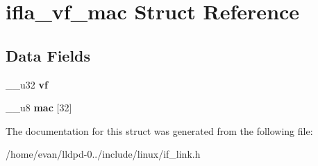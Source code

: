 \section{ifla\-\_\-vf\-\_\-mac \-Struct \-Reference}
\label{structifla__vf__mac}
\subsection*{\-Data \-Fields}
\begin{DoxyCompactItemize}
\item 
\-\_\-\-\_\-u32 {\bfseries vf}\label{structifla__vf__mac_ac91d1ffe1c2fd7c6c010563893822165}

\item 
\-\_\-\-\_\-u8 {\bfseries mac} [32]\label{structifla__vf__mac_a16213f3bd01a62dd1b1245b853416ad0}

\end{DoxyCompactItemize}


\-The documentation for this struct was generated from the following file\-:\begin{DoxyCompactItemize}
\item 
/home/evan/lldpd-\/0../include/linux/if\-\_\-link.\-h\end{DoxyCompactItemize}
